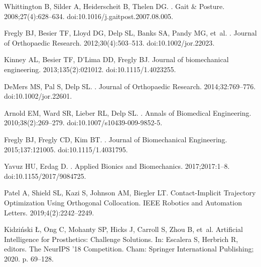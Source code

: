\documentclass[10pt,letterpaper]{article}
\begin{document}
\begin{thebibliography}{10}
    Whittington B, Silder A, Heiderscheit B, Thelen DG.
    .
    \newblock Gait \& Posture. 2008;27(4):628--634.
    \newblock doi:{10.1016/j.gaitpost.2007.08.005}.

    Fregly BJ, Besier TF, Lloyd DG, Delp SL, Banks SA, Pandy MG, et~al.
    .
    \newblock Journal of Orthopaedic Research. 2012;30(4):503--513.
    \newblock doi:{10.1002/jor.22023}.

    Kinney AL, Besier TF, D'Lima DD, Fregly BJ.
    \newblock Journal of biomechanical engineering. 2013;135(2):021012.
    \newblock doi:{10.1115/1.4023255}.

    DeMers MS, Pal S, Delp SL.
    .
    \newblock Journal of Orthopaedic Research. 2014;32:769--776.
    \newblock doi:{10.1002/jor.22601}.

    Arnold EM, Ward SR, Lieber RL, Delp SL.
    .
    \newblock Annals of Biomedical Engineering. 2010;38(2):269--279.
    \newblock doi:{10.1007/s10439-009-9852-5}.

    Fregly BJ, Fregly CD, Kim BT.
    .
    \newblock Journal of Biomechanical Engineering. 2015;137:121005.
    \newblock doi:{10.1115/1.4031795}.

    Yavuz HU, Erdag D.
    .
    \newblock Applied Bionics and Biomechanics. 2017;2017:1--8.
    \newblock doi:{10.1155/2017/9084725}.

    {Patel} A, {Shield} SL, {Kazi} S, {Johnson} AM, {Biegler} LT.
    \newblock Contact-Implicit Trajectory Optimization Using Orthogonal
    Collocation.
    \newblock IEEE Robotics and Automation Letters. 2019;4(2):2242--2249.

    Kidzi{\'{n}}ski {\L}, Ong C, Mohanty SP, Hicks J, Carroll S, Zhou B, et~al.
    \newblock Artificial Intelligence for Prosthetics: Challenge Solutions.
    \newblock In: Escalera S, Herbrich R, editors. The NeurIPS '18 Competition.
    Cham: Springer International Publishing; 2020. p. 69--128.


\end{thebibliography}
\end{document}
